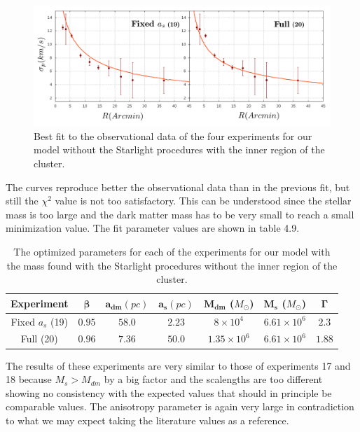 \begin{figure}[H]
\centering
\includegraphics[width=15cm]{images/Starlight_1.png}
\caption[Best fit of our model with the mass found with the Starlight procedures without the inner region]{Best fit to the observational data of the four experiments for our model without the Starlight procedures with the inner region of the cluster.}
\end{figure}

The curves reproduce better the observational data than in the previous fit, but still the $\chi^{2}$ value is not too satisfactory. This can be understood since the stellar mass is too large and the dark matter mass has to be very small to reach a small minimization value. The fit parameter values are shown in table 4.9.

\begin{table}[H]
\centering
\begin{tabular}{| c| c| c| c| c| c| c|}
    \hline
    \textbf{Experiment} & $\mathbf{\beta}$ & $\mathbf{a_{dm}} (pc)$ & $\mathbf{a_{s}} (pc)$ & $\mathbf{M_{dm}}$ ($M_{\odot}$) & $\mathbf{M_{s}}$ ($M_{\odot}$) & $\mathbf{\Gamma}$\\ \hline
	Fixed $a_s$ (19) &	$0.95$ &	$58.0$ &	$\mathbf{2.23}$ &	$8 \times 10^{4}$ &	$6.61 \times 10 ^{6}$ &	$2.3$\\ \hline
	Full (20) &	$0.96$ &	$7.36$ &	$50.0$ &	$1.35 \times 10^{6}$ &	$6.61 \times 10^{6}$ &	$1.88$\\ \hline
  \end{tabular} 
\caption[Optimized parameters for our model with the mass found with the Starlight procedures without the inner region.]{The optimized parameters for each of the experiments for our model with the mass found with the Starlight procedures without the inner region of the cluster.}
\end{table}

The results of these experiments are very similar to those of experiments 17 and 18 because $M_{s}>M_{dm}$ by a big factor and the scalengths are too different showing no consistency with the expected values that should in principle be comparable values. The anisotropy parameter is again very large in contradiction to what we may expect taking the literature values as a reference.

